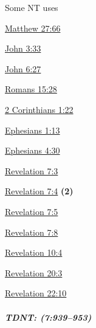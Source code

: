 				\begin{compactdesc}
					\item[Some NT uses] \textbf{}
						\begin{compactdesc}
							\item[{\hyperref[MATTHEW-27-66]{Matthew 27:66}}]
							\item[{\hyperref[JOHN-3-33]{John 3:33}}]
							\item[{\hyperref[JOHN-6:27]{John 6:27}}]
							\item[{\hyperref[ROMANS-15-28]{Romans 15:28}}]
							\item[{\hyperref[2CORINTHIANS-1-22]{2 Corinthians 1:22}}]
							\item[{\hyperref[EPHESIANS-1-13]{Ephesians 1:13}}]
							\item[{\hyperref[EPHESIANS-4-30]{Ephesians 4:30}}]
							\item[{\hyperref[REVELATIONNT-7-3]{Revelation 7:3}}]
							\item[{\hyperref[REVELATIONNT-7-4]{Revelation 7:4}}] \textbf{(2)}
							\item[{\hyperref[REVELATIONNT-7-5]{Revelation 7:5}}]
							\item[{\hyperref[REVELATIONNT-7-8]{Revelation 7:8}}]
							\item[{\hyperref[REVELATIONNT-10-4]{Revelation 10:4}}]
							\item[{\hyperref[REVELATIONNT-20-3]{Revelation 20:3}}]
							\item[{\hyperref[REVELATIONNT-22-10]{Revelation 22:10}}]
						\end{compactdesc}
				\end{compactdesc}
				
			\subparagraph{TDNT: \texorpdfstring{}{}  (7:939--953)}
				\label{SPHRAGIZO-TDNT}
		
	
		
		
